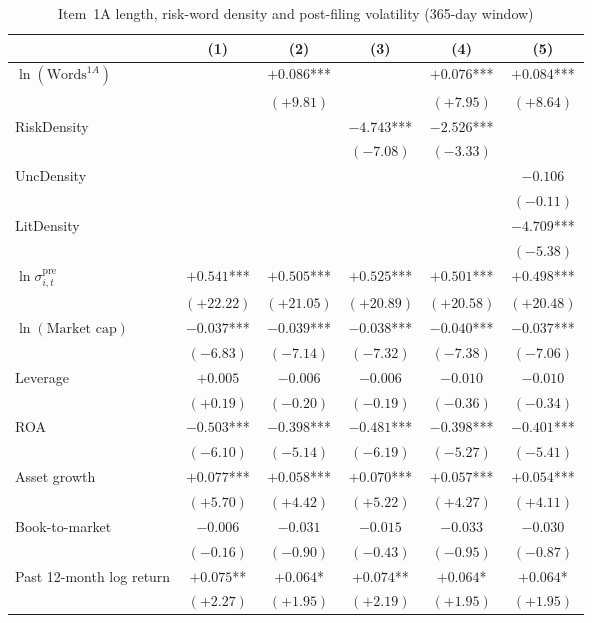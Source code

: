 \begin{table}[htbp]
\centering
\caption{Item~1A length, risk-word density and post-filing volatility (365-day window)}
\label{tab:main_365d}
\small
\begin{tabular}{lccccc}
\toprule
 & (1) & (2) & (3) & (4) & (5) \\
\midrule
$\ln(\text{Words}^{1A})$ &  & $+0.086$*** &  & $+0.076$*** & $+0.084$*** \\
 &  & $(+9.81)$ &  & $(+7.95)$ & $(+8.64)$ \\[2pt]
RiskDensity &  &  & $-4.743$*** & $-2.526$*** &  \\
 &  &  & $(-7.08)$ & $(-3.33)$ &  \\[2pt]
UncDensity &  &  &  &  & $-0.106$ \\
 &  &  &  &  & $(-0.11)$ \\[2pt]
LitDensity &  &  &  &  & $-4.709$*** \\
 &  &  &  &  & $(-5.38)$ \\[2pt]
$\ln\sigma^{\mathrm{pre}}_{i,t}$ & $+0.541$*** & $+0.505$*** & $+0.525$*** & $+0.501$*** & $+0.498$*** \\
 & $(+22.22)$ & $(+21.05)$ & $(+20.89)$ & $(+20.58)$ & $(+20.48)$ \\[2pt]
$\ln(\text{Market cap})$ & $-0.037$*** & $-0.039$*** & $-0.038$*** & $-0.040$*** & $-0.037$*** \\
 & $(-6.83)$ & $(-7.14)$ & $(-7.32)$ & $(-7.38)$ & $(-7.06)$ \\[2pt]
Leverage & $+0.005$ & $-0.006$ & $-0.006$ & $-0.010$ & $-0.010$ \\
 & $(+0.19)$ & $(-0.20)$ & $(-0.19)$ & $(-0.36)$ & $(-0.34)$ \\[2pt]
ROA & $-0.503$*** & $-0.398$*** & $-0.481$*** & $-0.398$*** & $-0.401$*** \\
 & $(-6.10)$ & $(-5.14)$ & $(-6.19)$ & $(-5.27)$ & $(-5.41)$ \\[2pt]
Asset growth & $+0.077$*** & $+0.058$*** & $+0.070$*** & $+0.057$*** & $+0.054$*** \\
 & $(+5.70)$ & $(+4.42)$ & $(+5.22)$ & $(+4.27)$ & $(+4.11)$ \\[2pt]
Book-to-market & $-0.006$ & $-0.031$ & $-0.015$ & $-0.033$ & $-0.030$ \\
 & $(-0.16)$ & $(-0.90)$ & $(-0.43)$ & $(-0.95)$ & $(-0.87)$ \\[2pt]
Past 12-month log return & $+0.075$** & $+0.064$* & $+0.074$** & $+0.064$* & $+0.064$* \\
 & $(+2.27)$ & $(+1.95)$ & $(+2.19)$ & $(+1.95)$ & $(+1.95)$ \\[2pt]

\end{tabular}
\end{table}
